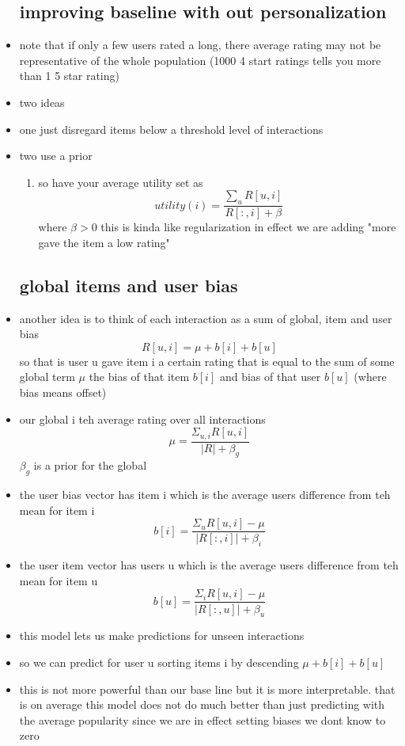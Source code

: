 \documentclass{article}
\begin{document}
\begin{itemize}
\subsection*{improving baseline with out personalization}
\item note that if only a few users rated a long, there average rating may not be representative of the whole population  (1000 4 start ratings tells you more than 1 5 star rating)
\item two ideas 
\item one just disregard items below a threshold level of interactions 
\item two use a prior 
\begin{enumerate}
    \item so have your average utility set as $$utility(i)=\frac{\sum_{u}R[u,i]}{R[:,i]+\beta}$$ where $\beta>0$ this is kinda like regularization in effect we are adding "more gave the item a low rating"
\end{enumerate}
\subsection*{global items and user bias}
\item another idea is to think of each interaction as a sum of global, item and user bias 
$$ R[u,i]=\mu+b[i]+b[u]$$ so that is user u gave item i a certain rating that is equal to the sum of some global term $\mu$ the bias of that item $b[i]$ and  bias of that user $b[u]$ (where bias means offset)
\item our global i teh average rating over all interactions $$\mu =\frac{\Sigma_{u,i}R[u,i]}{|R|+\beta_{g}}$$ $\beta_{g}$ is a prior for the global 
\item  the user bias vector has item i which is the average users difference from teh mean for item i $$b[i] =\frac{\Sigma_{u}R[u,i]-\mu}{|R[:,i]|+\beta_{i}}$$
\item  the user item vector has users u which is the average users difference from teh mean for item u $$b[u] =\frac{\Sigma_{i}R[u,i]-\mu}{|R[:,u]|+\beta_{u}}$$
\item this model lets us make predictions for unseen interactions
\item so we can predict for user u sorting items i by descending $\mu+b[i]+b[u]$
\item this is not more powerful than our base line but it is more interpretable. that is on average this model does not do much better than just predicting with the average popularity since we are in effect setting biases we dont know to zero

\end{itemize}
\end{document}
